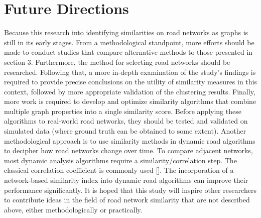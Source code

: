 \section{Future Directions}
Because this research into identifying similarities on road networks as graphs is still in its early stages. From a methodological standpoint, more efforts should be made to conduct studies that compare alternative methods to those presented in section 3. Furthermore, the method for selecting road networks should be researched. Following that, a more in-depth examination of the study's findings is required to provide precise conclusions on the utility of similarity measures in this context, followed by more appropriate validation of the clustering results. Finally, more work is required to develop and optimize similarity algorithms that combine multiple graph properties into a single similarity score. Before applying these algorithms to real-world road networks, they should be tested and validated on simulated data (where ground truth can be obtained to some extent). Another methodological approach is to use similarity methods in dynamic road algorithms to decipher how road networks change over time. To compare adjacent networks, most dynamic analysis algorithms require a similarity/correlation step. The classical correlation coefficient is commonly used [\cite{ONeill:2018}]. The incorporation of a network-based similarity index into dynamic road algorithms can improve their performance significantly.
It is hoped that this study will inspire other researchers to contribute ideas in the field of road network similarity that are not described above, either methodologically or practically.